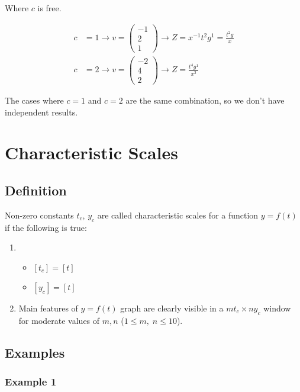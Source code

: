 \documentclass[12pt]{article}
\begin{document}
  Where $c$ is free.

\begin{equation}
  \begin{aligned}
    c &= 1 \rightarrow v =
    \begin{pmatrix}
      -1 \\ 2 \\ 1
    \end{pmatrix} \rightarrow
    Z = x^{-1} t^2 g^1 = \frac{t^2g}{x} \\
    c &= 2 \rightarrow v=
    \begin{pmatrix}
      -2 \\ 4 \\ 2
    \end{pmatrix} \rightarrow
    Z = \frac{t^4g^1}{x^2}
  \end{aligned}
\end{equation}

The cases where $c=1$ and $c=2$ are the same combination, so we don't have
independent results.

\section{Characteristic Scales}
\subsection{Definition}
Non-zero constants $t_c$, $y_c$ are called characteristic scales for a function
$y=f(t)$ if the following is true:

\begin{enumerate}
\item \begin{itemize}
\item $[t_c] = [t]$
\item $[y_c] = [t]$
\end{itemize}

\item Main features of $y=f(t)$ graph are clearly visible in a $mt_c \times ny_c$
   window for moderate values of $m,n$ ($1 \le m, \; n \le 10$).
\end{enumerate}

\subsection{Examples}
\subsubsection{Example 1}
\end{document}
